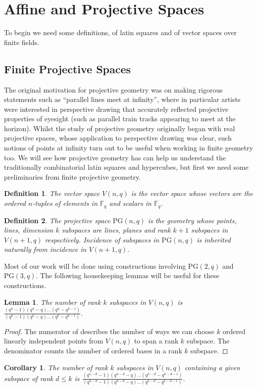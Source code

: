 \documentclass{article}
\newtheorem{lemma}{Lemma}
\newtheorem{corollary}{Corollary}
\newtheorem{definition}{Definition}
\newcommand{\PG}{\mathrm{PG}}
\begin{document}
\section{Affine and Projective Spaces}
To begin we need some definitions, of latin squares and of vector spaces over finite fields.

\subsection{Finite Projective Spaces}

The original motivation for projective geometry was on making rigorous
statements such as “parallel lines meet at infinity”, where in particular artists were interested in perspective drawing that accurately reflected projective properties of eyesight (such as parallel train tracks appearing to meet at the horizon).
Whilst the study of projective geometry originally
began with real projective spaces, whose application to perspective drawing was
clear, such notions of points at infinity turn out to be useful when working in
finite geometry too. We will see how projective geometry has can help us understand the
traditionally combinatorial latin squares and hypercubes, but first we need some
preliminaries from finite projective geometry.

\begin{definition}
  The vector space \(V(n, q)\) is the vector space whose vectors are the ordered \(n\)-tuples of elements in \(\mathbb{F}_q\) and scalars in \(\mathbb{F}_q\).
\end{definition}

\begin{definition}
  The projective space \(\PG(n, q)\) is the geometry whose points, lines, dimension \(k\) subspaces are lines, planes and rank \(k + 1\) subspaces in \(V(n + 1, q)\) respectively. Incidence of subspaces in \(\PG(n, q)\) is inherited naturally from incidence in \(V(n + 1, q)\).
\end{definition}

Most of our work will be done using constructions involving \(\PG(2, q)\) and \(\PG(3, q)\). The following housekeeping lemmas will be useful for these constructions.

\begin{lemma}\label{lemma:1}
  The number of rank \(k\) subspaces in \(V(n, q)\) is \(\frac{(q^n - 1)(q^n - q)\ldots (q^n - q^{k - 1})}{(q^k - 1)(q^k - q)\ldots (q^k - q^{k - 1})}\).
\end{lemma}
\begin{proof}
  The numerator of describes the number of ways we can choose \(k\) ordered linearly independent points from \(V(n, q)\) to span a rank \(k\) subspace. The denominator counts the number of ordered bases in a rank \(k\) subspace.
\end{proof}
\begin{corollary}
  The number of rank \(k\) subspaces in \(V(n, q)\) containing a given subspace of rank \(d \leq k\) is
  \(\frac{(q^{n - d} - 1)(q^{n - d} - q) \ldots (q^{n - d} - q^{k - d - 1})}{(q^{k - d} - 1) (q^{k - d} - q) \ldots (q^{k - d} - q^{k - d - 1})}\).
\end{corollary}
\end{document}
